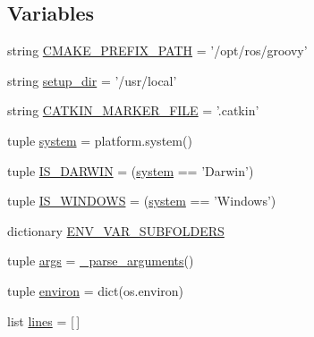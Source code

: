 \subsection*{\-Variables}
\begin{DoxyCompactItemize}
\item 
string \hyperlink{namespace__setup__util_a44bed5f85daa4641b3c144edb9e8c1c1}{\-C\-M\-A\-K\-E\-\_\-\-P\-R\-E\-F\-I\-X\-\_\-\-P\-A\-T\-H} = '/opt/ros/groovy'
\item 
string \hyperlink{namespace__setup__util_ab2982d6f704ffe12a600c08a995d40d3}{setup\-\_\-dir} = '/usr/local'
\item 
string \hyperlink{namespace__setup__util_a3fa0ca5a460a71a43cbc3d4954ab1f10}{\-C\-A\-T\-K\-I\-N\-\_\-\-M\-A\-R\-K\-E\-R\-\_\-\-F\-I\-L\-E} = '.catkin'
\item 
tuple \hyperlink{namespace__setup__util_a5883fa688e2e824754a412ffc772863e}{system} = platform.\-system()
\item 
tuple \hyperlink{namespace__setup__util_aecbb100ce6f94bb3c7e16d58fde05f96}{\-I\-S\-\_\-\-D\-A\-R\-W\-I\-N} = (\hyperlink{namespace__setup__util_a5883fa688e2e824754a412ffc772863e}{system} == '\-Darwin')
\item 
tuple \hyperlink{namespace__setup__util_a6fe69c2dbd92959b6651a28cbb846e6e}{\-I\-S\-\_\-\-W\-I\-N\-D\-O\-W\-S} = (\hyperlink{namespace__setup__util_a5883fa688e2e824754a412ffc772863e}{system} == '\-Windows')
\item 
dictionary \hyperlink{namespace__setup__util_aa31804f1be8660156ce9394b33c68dc4}{\-E\-N\-V\-\_\-\-V\-A\-R\-\_\-\-S\-U\-B\-F\-O\-L\-D\-E\-R\-S}
\item 
tuple \hyperlink{namespace__setup__util_ac67cb2d93e0636936bcbeb363e2c87c3}{args} = \hyperlink{namespace__setup__util_a68bdee5b1b36ce340607c5f122fc04ff}{\-\_\-parse\-\_\-arguments}()
\item 
tuple \hyperlink{namespace__setup__util_a0a3189a3fa13a696964c791ed2a5ea85}{environ} = dict(os.\-environ)
\item 
list \hyperlink{namespace__setup__util_a8618d8be5f729d4c9696daa5e083a001}{lines} = \mbox{[}$\,$\mbox{]}
\end{DoxyCompactItemize}


